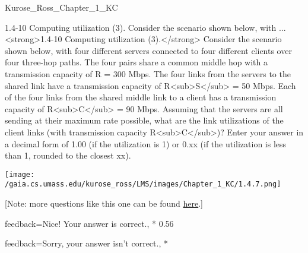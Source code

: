 \documentclass[a4paper]{article}
\begin{document}
\begin{quiz}{Kurose_Ross_Chapter_1_KC}
\begin{shortanswer}[
	points=1,
	penalty=0.33333,
]{1.4-10 Computing utilization (3). Consider the scenario shown below, with ...}
<strong>1.4-10 Computing utilization (3).</strong> Consider the scenario shown below, with four different servers connected to four different clients over four three-hop paths. The four pairs share a common middle hop with a transmission capacity of R = 300 Mbps. The four links from the servers to the shared link have a transmission capacity of R<sub>S</sub> = 50 Mbps. Each of the four links from the shared middle link to a client has a transmission capacity of R<sub>C</sub> = 90 Mbps. Assuming that the servers are all sending at their maximum rate possible, what are the link utilizations of the client links (with transmission capacity R<sub>C</sub>)? Enter your answer in a decimal form of 1.00 (if the utilization is 1) or 0.xx (if the utilization is less than 1, rounded to the closest xx). 
\begin{center}
\texttt{[image: /gaia.cs.umass.edu/kurose\_ross/LMS/images/Chapter\_1\_KC/1.4.7.png]}
\end{center}
 [Note: more questions like this one can be found \href{http://gaia.cs.umass.edu/kurose_ross/interactive/end-end-throughput-simple.php}{here}.]
\item[feedback={Nice!  Your answer is correct.},]* 0.56
\item[feedback={Sorry, your answer isn't correct.},] *
\end{shortanswer}

\end{quiz}
\end{document}
